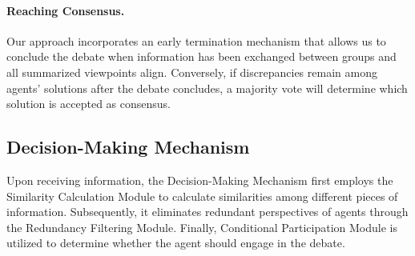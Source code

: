 \paragraph{Reaching Consensus.} Our approach incorporates an early termination mechanism that allows us to conclude the debate when information has been exchanged between groups and all summarized viewpoints align. Conversely, if discrepancies remain among agents' solutions after the debate concludes, a majority vote will determine which solution is accepted as consensus.


\subsection{Decision-Making Mechanism} Upon receiving information, the Decision-Making Mechanism first employs the Similarity Calculation Module to calculate similarities among different pieces of information. Subsequently, it eliminates redundant perspectives of agents through the Redundancy Filtering Module. Finally, Conditional Participation Module is utilized to determine whether the agent should engage in the debate.


